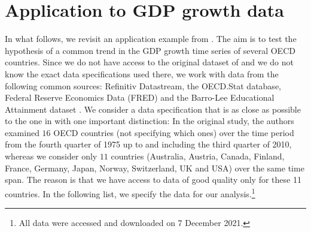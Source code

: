 \documentclass[12pt]{article}
\begin{document}
%
  



\section{Application to GDP growth data}\label{sec:app:gdp}


In what follows, we revisit an application example from \cite{Zhang2012}. The aim is to test the hypothesis of a common trend in the GDP growth time series of several OECD countries. Since we do not have access to the original dataset of \cite{Zhang2012} and we do not know the exact data specifications used there, we work with data from the following common sources: Refinitiv Datastream, the OECD.Stat database, Federal Reserve Economics Data (FRED) and the Barro-Lee Educational Attainment dataset \citep*{Barro2013}. We consider a data specification that is as close as possible to the one in \cite{Zhang2012} with one important distinction: In the original study, the authors examined $16$ OECD countries (not specifying which ones) over the time period from the fourth quarter of 1975 up to and including the third quarter of 2010, whereas we consider only $11$ countries (Australia, Austria, Canada, Finland, France, Germany, Japan, Norway, Switzerland, UK and USA) over the same time span. The reason is that we have access to data of good quality only for these 11 countries. 
In the following list, we specify the data for our analysis.\footnote{All data were accessed and downloaded on 7 December 2021.}
\end{document}
